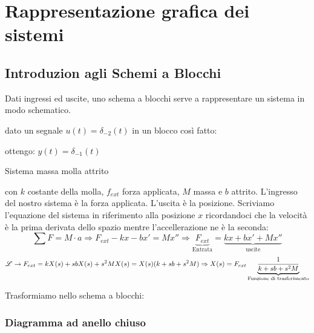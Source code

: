 \chapter{Rappresentazione grafica dei sistemi}
\section{Introduzion agli Schemi a Blocchi}
Dati ingressi ed uscite, uno schema a blocchi serve a rappresentare un sistema in modo schematico.

\begin{example}
	
	dato un segnale $ u(t)=\delta_{-2}(t) $ in un blocco così fatto:
	
	\begin{center}
	
	\end{center}
	ottengo:  $ y(t)=\delta_{-1}(t) $
\end{example}

\begin{example}
	Sistema massa molla attrito
	
	\begin{center}
	
	\end{center}

	con $ k $ costante della molla, $ f_{ext} $ forza applicata, $ M $ massa e $ b $ attrito.
	L'ingresso del nostro sistema è la forza applicata. L'uscita è la posizione.
	Scriviamo l'equazione del sistema in riferimento alla posizione $ x $ ricordandoci che la velocità è la prima derivata dello spazio mentre l'accellerazione ne è la seconda:
	\[
		\sum F = M \cdot a \Rightarrow F_{ext}-kx-bx'= Mx'' \Rightarrow \underbrace{F_{ext}}_{\text{Entrata}}=\underbrace{kx+bx'+ Mx''}_{\text{uscite}}
	\]
	\[
		\mathscr{L} \rightarrow F_{ext}=kX(s)+sbX(s)+ s^2MX(s) 
		= X(s) (k+sb+s^2M) \Rightarrow X(s)=F_{ext} \underbrace{\frac{1}{k+sb+s^2M}}_{\text{Funzione di trasferimento}}
	\]
	
	Trasformiamo nello schema a blocchi:
	
	\begin{center}
	
	\end{center}
\end{example}

\subsection{Diagramma ad anello chiuso}

